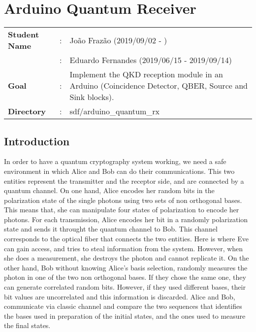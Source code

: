 \clearpage
\section{Arduino Quantum Receiver}

\begin{refsection}
	
	\begin{tcolorbox}	
		\begin{tabular}{p{2.75cm} p{0.2cm} p{10.5cm}} 	
			\textbf{Student Name}  		&:&  Jo\~ao Fraz\~ao (2019/09/02 - )\\
			&:&  Eduardo Fernandes (2019/06/15 - 2019/09/14)\\
			\textbf{Goal}          &:& Implement the QKD reception module in an Arduino (Coincidence Detector, QBER, Source and Sink blocks).\\
			\textbf{Directory}              &:& sdf/arduino\_quantum\_rx
		\end{tabular}
	\end{tcolorbox}
 
    \subsection{Introduction }
    In order to have a quantum cryptography system working, we need a safe environment in which Alice and Bob can do their communications. This two entities represent the transmitter and the receptor side, and are connected by a quantum channel. On one hand, Alice encodes her random bits in the polarization state of the single photons using two sets of non orthogonal bases. This means that, she can manipulate four states of polarization to encode her  photons. For each transmission, Alice encodes her bit in a randomly polarization state and sends it throught the quantum channel to Bob. This channel corresponds to the optical fiber that connects the two entities. Here is where Eve can gain access, and tries to steal information from the system. However, when she does a measurement, she destroys the photon and cannot replicate it. On the other hand, Bob without knowing Alice's basis selection, randomly measures the photon in one of the two non orthogonal bases. If they chose the same one, they can generate correlated random bits. However, if they used different bases, their bit values are uncorrelated and this information is discarded. Alice and Bob, communicate via classic channel and compare the two sequences that identifies the bases used in preparation of the initial states, and the ones used to measure the final states.


\end{refsection}
